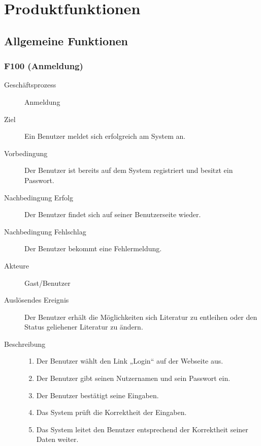 
\chapter{Produktfunktionen}


\section{Allgemeine Funktionen}
\subsection{F100 (Anmeldung)}
\begin{description}
  \item[Geschäftsprozess]Anmeldung
  \item[Ziel]Ein Benutzer meldet sich erfolgreich am System an.
  \item[Vorbedingung]Der Benutzer ist bereits auf dem System registriert und besitzt ein Passwort.
  \item[Nachbedingung Erfolg]Der Benutzer findet sich auf seiner Benutzerseite wieder.
  \item[Nachbedingung Fehlschlag]Der Benutzer bekommt eine Fehlermeldung.
  \item[Akteure]Gast/Benutzer
  \item[Auslösendes Ereignis]Der Benutzer erhält die Möglichkeiten sich Literatur zu entleihen oder den Status geliehener Literatur zu ändern.
  \item[Beschreibung]
    \begin{enumerate}
      \item Der Benutzer wählt den Link „Login“ auf der Webseite aus.
      \item Der Benutzer gibt seinen Nutzernamen und sein Passwort ein.
      \item Der Benutzer bestätigt seine Eingaben.
      \item Das System prüft die Korrektheit der Eingaben.
      \item Das System leitet den Benutzer entsprechend der Korrektheit seiner Daten weiter.
    \end{enumerate}
\end{description}

